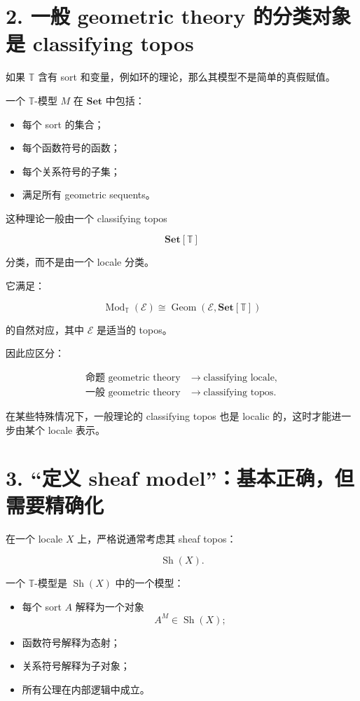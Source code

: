 \documentclass{ctexart}
\begin{document}
\section*{2. 一般 geometric theory 的分类对象是 classifying topos}

如果 \(\mathbb T\) 含有 sort 和变量，例如环的理论，那么其模型不是简单的真假赋值。

一个 \(\mathbb T\)-模型 \(M\) 在 \(\mathbf{Set}\) 中包括：

\begin{itemize}
\item 每个 sort 的集合；
\item 每个函数符号的函数；
\item 每个关系符号的子集；
\item 满足所有 geometric sequents。
\end{itemize}

这种理论一般由一个 classifying topos

\[
\mathbf{Set}[\mathbb T]
\]

分类，而不是由一个 locale 分类。

它满足：

\[
\operatorname{Mod}_{\mathbb T}(\mathcal E)
\cong
\operatorname{Geom}(\mathcal E,\mathbf{Set}[\mathbb T])
\]

的自然对应，其中 \(\mathcal E\) 是适当的 topos。

因此应区分：

\[
\boxed{
\begin{aligned}
\text{命题 geometric theory}
&\longrightarrow \text{classifying locale},\\
\text{一般 geometric theory}
&\longrightarrow \text{classifying topos}.
\end{aligned}
}
\]

在某些特殊情况下，一般理论的 classifying topos 也是 localic 的，这时才能进一步由某个 locale 表示。

\section*{3. ``定义 sheaf model''：基本正确，但需要精确化}

在一个 locale \(X\) 上，严格说通常考虑其 sheaf topos：

\[
\operatorname{Sh}(X).
\]

一个 \(\mathbb T\)-模型是 \(\operatorname{Sh}(X)\) 中的一个模型：

\begin{itemize}
\item 每个 sort \(A\) 解释为一个对象
  \[
  A^M\in\operatorname{Sh}(X);
  \]
\item 函数符号解释为态射；
\item 关系符号解释为子对象；
\item 所有公理在内部逻辑中成立。
\end{itemize}
\end{document}
